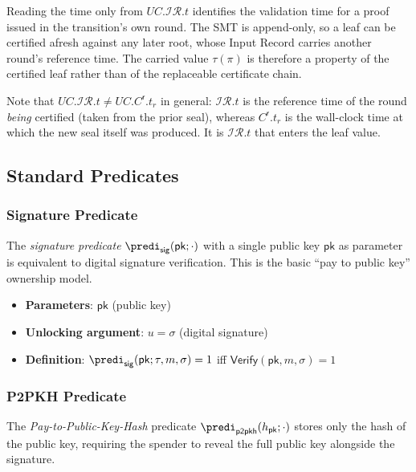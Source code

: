 Reading the time only from $UC.\mathcal{IR}.t$ identifies the validation time for a proof issued in the transition's own round. The SMT is append-only, so a leaf can be certified afresh against any later root, whose Input Record carries another round's reference time. The carried value $\tau(\pi)$ is therefore a property of the certified leaf rather than of the replaceable certificate chain.

Note that $UC.\mathcal{IR}.t \ne UC.C^\mathsf{r}.t_r$ in general: $\mathcal{IR}.t$ is the reference time of the round \emph{being} certified (taken from the prior seal), whereas $C^\mathsf{r}.t_r$ is the wall-clock time at which the new seal itself was produced. It is $\mathcal{IR}.t$ that enters the leaf value.

\subsection{Standard Predicates}\label{sec:standard-predicates}

\subsubsection{Signature Predicate}

The \emph{signature predicate} $\predi_\mathsf{sig}(\mathsf{pk};\cdot)$ with a single public key $\mathsf{pk}$ as parameter is equivalent to digital signature verification. This is the basic ``pay to public key'' ownership model.

\begin{itemize}
	\item \textbf{Parameters}: $\mathsf{pk}$ (public key)
	\item \textbf{Unlocking argument}: $u = \sigma$ (digital signature)
	\item \textbf{Definition}: $\predi_\mathsf{sig}(\mathsf{pk}; \tau, m, \sigma) = 1$ iff $\mathsf{Verify}(\mathsf{pk}, m, \sigma) = 1$
\end{itemize}

\subsubsection{P2PKH Predicate}

The \emph{Pay-to-Public-Key-Hash} predicate $\predi_\mathsf{p2pkh}(h_\mathsf{pk};\cdot)$ stores only the hash of the public key, requiring the spender to reveal the full public key alongside the signature.

